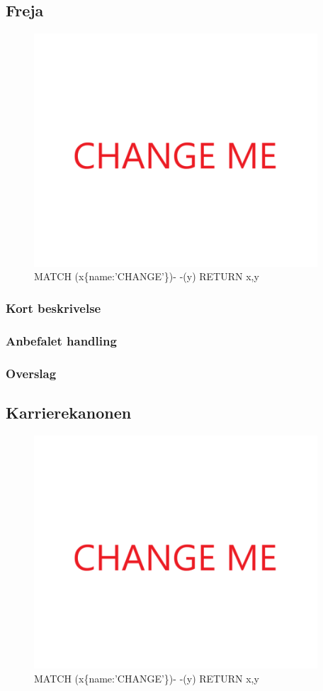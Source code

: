 \documentclass{article}
\begin{document}
\subsection{Freja}
\begin{figure}[h]
\includegraphics[width=300pt]{CHANGE.PNG}
\caption{MATCH (x\{name:'CHANGE'\})- -(y) RETURN x,y}
\end{figure}
\subsubsection{Kort beskrivelse}
\subsubsection{Anbefalet handling}
\subsubsection{Overslag}


\subsection{Karrierekanonen}
\begin{figure}[h]
\includegraphics[width=300pt]{CHANGE.PNG}
\caption{MATCH (x\{name:'CHANGE'\})- -(y) RETURN x,y}
\end{figure}
\end{document}
